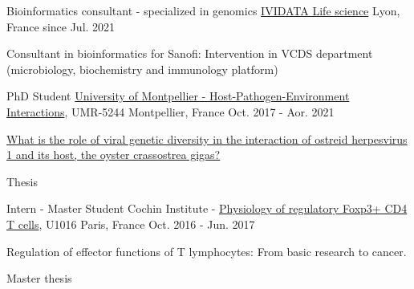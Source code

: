 

\begin{cventries}

 \cventry
    {Bioinformatics consultant - specialized in genomics} %
    {\href{https://www.ividata.com/}{IVIDATA Life science}} %
    {Lyon, France} %
    {since Jul. 2021} %
    {
      \begin{cvitems} %
        \item {Consultant in bioinformatics for Sanofi: Intervention in VCDS department (microbiology, biochemistry and immunology platform)}
      \end{cvitems}
    }
    
  \cventry
    {PhD Student}%
    {\href{http://ihpe.univ-perp.fr/}{University of Montpellier - Host-Pathogen-Environment Interactions}, UMR-5244} %
    {Montpellier, France} %
    {Oct. 2017 - Aor. 2021} %
    {
      \begin{cvitems} %
        \item {\href{https://www.theses.fr/2021MONTG012}{What is the role of viral genetic diversity in the interaction of ostreid herpesvirus 1 and its host, the oyster crassostrea gigas?}}
        \item {Thesis}
      \end{cvitems}
    }
    
  \cventry
    {Intern - Master Student}%
    {Cochin Institute - \href{https://www.institutcochin.fr/departments/3i/team-lucas/physiology-of-regulatory-foxp3-cd4-t-cells}{Physiology of regulatory Foxp3+ CD4 T cells}, U1016} %
    {Paris, France} %
    {Oct. 2016 - Jun. 2017} %
    {
      \begin{cvitems} %
        \item {Regulation of effector functions of T lymphocytes: From basic research to cancer.}
        \item {Master thesis}
      \end{cvitems}
    }


\end{cventries}
